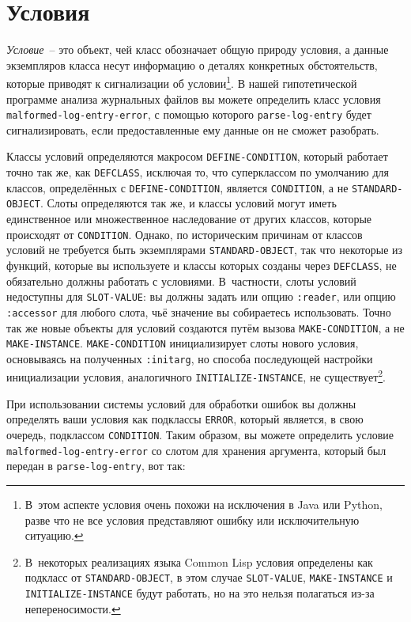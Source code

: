 \section{Условия}

\textit{Условие}~-- это объект, чей класс обозначает общую природу условия, а данные
экземпляров класса несут информацию о деталях конкретных обстоятельств, которые приводят к
сигнализации об условии\footnote{В~этом аспекте условия очень похожи на исключения в Java
  или Python, разве что не все условия представляют ошибку или исключительную ситуацию.}. В
нашей гипотетической программе анализа журнальных файлов вы можете определить класс
условия \lstinline{malformed-log-entry-error}, с помощью которого \lstinline{parse-log-entry} будет
сигнализировать, если предоставленные ему данные он не сможет разобрать.

Классы условий определяются макросом \lstinline{DEFINE-CONDITION}, который работает точно так
же, как \lstinline{DEFCLASS}, исключая то, что суперклассом по умолчанию для классов,
определённых с \lstinline{DEFINE-CONDITION}, является \lstinline{CONDITION}, а не
\lstinline{STANDARD-OBJECT}. Слоты определяются так же, и классы условий могут иметь
единственное или множественное наследование от других классов, которые происходят от
\lstinline{CONDITION}. Однако, по историческим причинам от классов условий не требуется быть
экземплярами \lstinline{STANDARD-OBJECT}, так что некоторые из функций, которые вы используете
и классы которых созданы через \lstinline{DEFCLASS}, не обязательно должны работать с
условиями. В~частности, слоты условий недоступны для \lstinline{SLOT-VALUE}: вы должны задать
или опцию \lstinline{:reader}, или опцию \lstinline{:accessor} для любого слота, чьё значение вы
собираетесь использовать. Точно так же новые объекты для условий создаются путём вызова
\lstinline{MAKE-CONDITION}, а не \lstinline{MAKE-INSTANCE}. \lstinline{MAKE-CONDITION} инициализирует
слоты нового условия, основываясь на полученных \lstinline{:initarg}, но способа последующей
настройки инициализации условия, аналогичного \lstinline{INITIALIZE-INSTANCE}, не
существует\footnote{В~некоторых реализациях языка Common Lisp условия определены как
  подкласс от \lstinline{STANDARD-OBJECT}, в этом случае \lstinline{SLOT-VALUE},
  \lstinline{MAKE-INSTANCE} и \lstinline{INITIALIZE-INSTANCE} будут работать, но на это нельзя
  полагаться из-за непереносимости.}.

При использовании системы условий для обработки ошибок вы должны определять ваши условия
как подклассы \lstinline{ERROR}, который является, в свою очередь, подклассом
\lstinline{CONDITION}. Таким образом, вы можете определить условие
\lstinline{malformed-log-entry-error} со слотом для хранения аргумента, который был передан в
\lstinline{parse-log-entry}, вот так:

